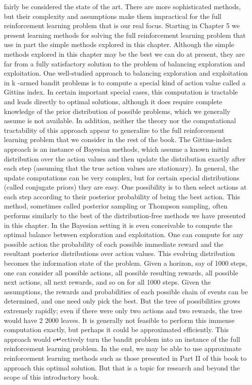 fairly be considered the state of the art. There are more sophisticated methods, but their
complexity and assumptions make them impractical for the full reinforcement learning
problem that is our real focus. Starting in Chapter 5 we present learning methods for
solving the full reinforcement learning problem that use in part the simple methods
explored in this chapter.
Although the simple methods explored in this chapter may be the best we can do
at present, they are far from a fully satisfactory solution to the problem of balancing
exploration and exploitation.
One well-studied approach to balancing exploration and exploitation in k -armed bandit
problems is to compute a special kind of action value called a Gittins index. In certain
important special cases, this computation is tractable and leads directly to optimal
solutions, although it does require complete knowledge of the prior distribution of possible
problems, which we generally assume is not available. In addition, neither the theory
nor the computational tractability of this approach appear to generalize to the full
reinforcement learning problem that we consider in the rest of the book.
The Gittins-index approach is an instance of Bayesian methods, which assume a known
initial distribution over the action values and then update the distribution exactly after
each step (assuming that the true action values are stationary). In general, the update
computations can be very complex, but for certain special distributions (called conjugate
priors) they are easy. One possibility is to then select actions at each step according
to their posterior probability of being the best action. This method, sometimes called
posterior sampling or Thompson sampling, often performs similarly to the best of the
distribution-free methods we have presented in this chapter.
In the Bayesian setting it is even conceivable to compute the optimal balance between
exploration and exploitation. One can compute for any possible action the probability
of each possible immediate reward and the resultant posterior distributions over action
values. This evolving distribution becomes the information state of the problem. Given
a horizon, say of 1000 steps, one can consider all possible actions, all possible resulting
rewards, all possible next actions, all next rewards, and so on for all 1000 steps. Given
the assumptions, the rewards and probabilities of each possible chain of events can be
determined, and one need only pick the best. But the tree of possibilities grows extremely
rapidly; even if there were only two actions and two rewards, the tree would have 2 2000
leaves. It is generally not feasible to perform this immense computation exactly, but
perhaps it could be approximated efficiently. This approach would e↵ectively turn the
bandit problem into an instance of the full reinforcement learning problem. In the end, we
may be able to use approximate reinforcement learning methods such as those presented
in Part II of this book to approach this optimal solution. But that is a topic for research
and beyond the scope of this introductory book.
